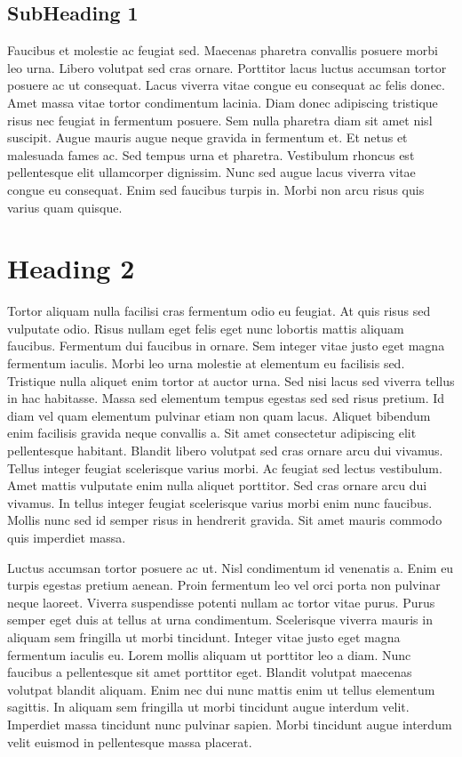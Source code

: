 \documentclass[letterpaper,10pt,english]{sphinxmanual}
\begin{document}
\subsection{Sub\sphinxhyphen{}Heading 1}
\label{\detokenize{topic1:sub-heading-1}}
\sphinxAtStartPar
Faucibus et molestie ac feugiat sed. Maecenas pharetra convallis posuere morbi leo urna. Libero volutpat sed cras ornare. Porttitor lacus luctus accumsan tortor posuere ac ut consequat. Lacus viverra vitae congue eu consequat ac felis donec. Amet massa vitae tortor condimentum lacinia. Diam donec adipiscing tristique risus nec feugiat in fermentum posuere. Sem nulla pharetra diam sit amet nisl suscipit. Augue mauris augue neque gravida in fermentum et. Et netus et malesuada fames ac. Sed tempus urna et pharetra. Vestibulum rhoncus est pellentesque elit ullamcorper dignissim. Nunc sed augue lacus viverra vitae congue eu consequat. Enim sed faucibus turpis in. Morbi non arcu risus quis varius quam quisque.


\section{Heading 2}
\label{\detokenize{topic1:heading-2}}
\sphinxAtStartPar
Tortor aliquam nulla facilisi cras fermentum odio eu feugiat. At quis risus sed vulputate odio. Risus nullam eget felis eget nunc lobortis mattis aliquam faucibus. Fermentum dui faucibus in ornare. Sem integer vitae justo eget magna fermentum iaculis. Morbi leo urna molestie at elementum eu facilisis sed. Tristique nulla aliquet enim tortor at auctor urna. Sed nisi lacus sed viverra tellus in hac habitasse. Massa sed elementum tempus egestas sed sed risus pretium. Id diam vel quam elementum pulvinar etiam non quam lacus. Aliquet bibendum enim facilisis gravida neque convallis a. Sit amet consectetur adipiscing elit pellentesque habitant. Blandit libero volutpat sed cras ornare arcu dui vivamus. Tellus integer feugiat scelerisque varius morbi. Ac feugiat sed lectus vestibulum. Amet mattis vulputate enim nulla aliquet porttitor. Sed cras ornare arcu dui vivamus. In tellus integer feugiat scelerisque varius morbi enim nunc faucibus. Mollis nunc sed id semper risus in hendrerit gravida. Sit amet mauris commodo quis imperdiet massa.

\sphinxAtStartPar
Luctus accumsan tortor posuere ac ut. Nisl condimentum id venenatis a. Enim eu turpis egestas pretium aenean. Proin fermentum leo vel orci porta non pulvinar neque laoreet. Viverra suspendisse potenti nullam ac tortor vitae purus. Purus semper eget duis at tellus at urna condimentum. Scelerisque viverra mauris in aliquam sem fringilla ut morbi tincidunt. Integer vitae justo eget magna fermentum iaculis eu. Lorem mollis aliquam ut porttitor leo a diam. Nunc faucibus a pellentesque sit amet porttitor eget. Blandit volutpat maecenas volutpat blandit aliquam. Enim nec dui nunc mattis enim ut tellus elementum sagittis. In aliquam sem fringilla ut morbi tincidunt augue interdum velit. Imperdiet massa tincidunt nunc pulvinar sapien. Morbi tincidunt augue interdum velit euismod in pellentesque massa placerat.
\end{document}
